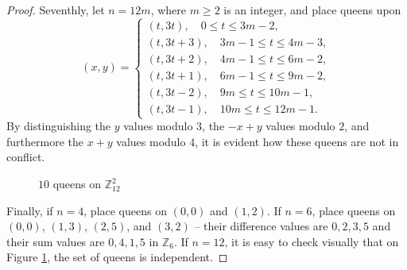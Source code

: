 \documentclass[11pt]{article}
\begin{document}
\begin{proof}
Seventhly, let $n=12m$, where $m\ge 2$ is an integer, and place queens upon
$$(x,y)=\begin{cases}
    (t,3t),\quad 0\le t\le 3m-2, \\
    (t,3t+3),\quad 3m-1\le t\le 4m-3, \\
    (t,3t+2),\quad 4m-1\le t\le 6m-2, \\
    (t,3t+1),\quad 6m-1\le t\le 9m-2, \\
    (t,3t-2),\quad 9m\le t\le 10m-1, \\
    (t,3t-1),\quad 10m\le t\le 12m-1.
\end{cases}$$
By distinguishing the $y$ values modulo $3$, the $-x+y$ values modulo $2$, and furthermore the $x+y$ values modulo $4$, it is evident how these queens are not in conflict.

\begin{figure}[!htb]
\centering
{} 
\caption{$10$ queens on $\mathbb{Z}_{12}^2$}
\label{case12}
\end{figure}

Finally, if $n=4$, place queens on $(0,0)$ and $(1,2)$. If $n=6$, place queens on $(0,0)$, $(1,3)$, $(2,5)$, and $(3,2)$ -- their difference values are $0,2,3,5$ and their sum values are $0,4,1,5$ in $\mathbb{Z}_6$. If $n=12$, it is easy to check visually that on Figure \ref{case12}, the set of queens is independent. \end{proof}
\end{document}
